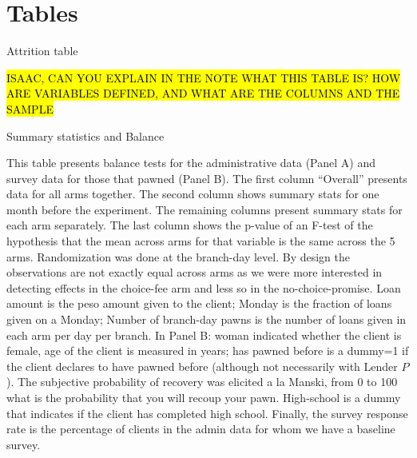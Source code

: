 \documentclass[oneside,11pt]{article}
\begin{document}
{\section{Tables}

\begin{table}[H]
\caption{Attrition table}
\label{attrition_table}
\begin{center}
\scriptsize{}
\end{center}
 \scriptsize  

 \noindent \hl{ISAAC, CAN YOU EXPLAIN IN THE NOTE WHAT THIS TABLE IS? HOW ARE VARIABLES DEFINED, AND WHAT ARE THE COLUMNS AND THE SAMPLE }
\end{table}


\begin{table}[H]
\caption{Summary statistics and Balance}
\label{SS}
\begin{center}
\scriptsize{}
\end{center}
 \scriptsize

\end{table}
\vspace{-.3in}
\scriptsize {
\noindent This table presents balance tests for the administrative data (Panel A) and survey data for those that pawned (Panel B). The first column ``Overall'' presents data for all arms together. The second column shows summary stats for one month before the experiment. The remaining columns present summary stats  for each arm separately. The last column shows the p-value of an F-test of the hypothesis that the mean across arms for that variable is the same across the 5 arms. Randomization was done at the branch-day level. By design the observations are not exactly equal across arms as we were more interested in detecting effects in the choice-fee arm and less so in the no-choice-promise. Loan amount is the peso amount given to the client; Monday is the fraction of loans given on a Monday; Number of branch-day pawns is the number of loans given in each arm per day per branch.  In Panel B: woman indicated whether the client is female, age of the client is measured in years; has pawned before is a dummy=1 if the client declares to have pawned before (although not necessarily with Lender $P$). The subjective probability of recovery was elicited a la Manski, from 0 to 100 what is the probability that you will recoup your pawn. High-school is a dummy that indicates if the client has completed high school. Finally, the survey response rate is the percentage of clients in the admin data for whom we have a baseline survey. %
}



}
\end{document}
